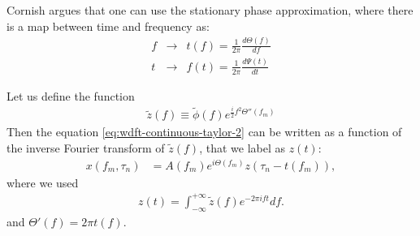 \documentclass{article}
\begin{document}


Cornish argues that one can use the stationary phase approximation, where there is a map between time and frequency as:
\begin{eqnarray}
    f & \longrightarrow & t(f) = \frac{1}{2 \pi} \frac{d\Theta(f)}{df} \\
    t & \longrightarrow & f(t) = \frac{1}{2 \pi} \frac{d\Psi(t)}{dt} 
\end{eqnarray}

Let us define the function
\begin{eqnarray}
    \tilde{z}(f) \equiv \tilde{\phi}(f) e^{\frac{i}{2} f^2 \Theta''(f_m)}
\end{eqnarray}
Then the equation \eqref{eq:wdft-continuous-taylor-2} can be written as a function of the inverse Fourier transform of $\tilde{z}(f)$, that we label as $z(t)$:
\begin{align}
\label{eq:wdft-continuous-taylor-3}
    x(f_m, \tau_n) & = A(f_m) e^{i\Theta(f_m)} z\left(\tau_n - t(f_m) \right),
\end{align}
where we used 
\begin{eqnarray}
\label{eq:z_inverse_fourier}
    z(t) = \int_{-\infty}^{+\infty}\tilde{z}(f) e^{-2\pi i f t} df.
\end{eqnarray}
and $\Theta'(f) = 2 \pi t(f)$.
\end{document}
